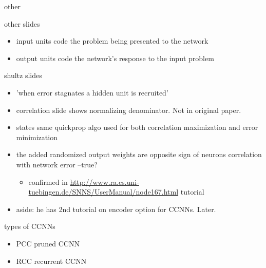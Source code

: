 \documentclass{beamer}
\begin{document}
\begin{frame}[label={sec:org558d821}]{other}
\begin{block}{other slides}
\begin{itemize}
\item input units code the problem being presented to the network
\item output units code the network's response to the input problem
\end{itemize}
\end{block}
\begin{block}{shultz slides}
\begin{itemize}
\item 'when error stagnates a hidden unit is recruited'
\item correlation slide shows normalizing denominator. Not in original paper.
\item states same quickprop algo used for both correlation maximization and error minimization
\item the added randomized output weights are opposite sign of neurons correlation with network error --true?
\begin{itemize}
\item confirmed in \url{http://www.ra.cs.uni-tuebingen.de/SNNS/UserManual/node167.html} tutorial
\end{itemize}
\item aside: he has 2nd tutorial on encoder option for CCNNs. Later.
\end{itemize}
\end{block}
\begin{block}{types of CCNNs}
\begin{itemize}
\item PCC pruned CCNN
\item RCC recurrent CCNN
\end{itemize}
\end{block}
\end{frame}
\end{document}

